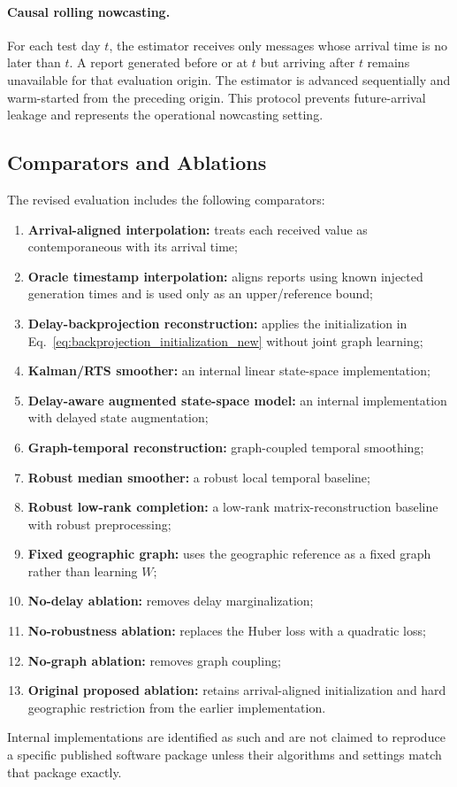 \paragraph{Causal rolling nowcasting.}
For each test day $t$, the estimator receives only messages whose arrival time is no later than $t$. A report generated before or at $t$ but arriving after $t$ remains unavailable for that evaluation origin. The estimator is advanced sequentially and warm-started from the preceding origin. This protocol prevents future-arrival leakage and represents the operational nowcasting setting.

\subsection{Comparators and Ablations}
\label{subsec:comparators_new}
The revised evaluation includes the following comparators:
\begin{enumerate}
    \item \textbf{Arrival-aligned interpolation:} treats each received value as contemporaneous with its arrival time;
    \item \textbf{Oracle timestamp interpolation:} aligns reports using known injected generation times and is used only as an upper/reference bound;
    \item \textbf{Delay-backprojection reconstruction:} applies the initialization in Eq.~\eqref{eq:backprojection_initialization_new} without joint graph learning;
    \item \textbf{Kalman/RTS smoother:} an internal linear state-space implementation;
    \item \textbf{Delay-aware augmented state-space model:} an internal implementation with delayed state augmentation;
    \item \textbf{Graph-temporal reconstruction:} graph-coupled temporal smoothing;
    \item \textbf{Robust median smoother:} a robust local temporal baseline;
    \item \textbf{Robust low-rank completion:} a low-rank matrix-reconstruction baseline with robust preprocessing;
    \item \textbf{Fixed geographic graph:} uses the geographic reference as a fixed graph rather than learning $W$;
    \item \textbf{No-delay ablation:} removes delay marginalization;
    \item \textbf{No-robustness ablation:} replaces the Huber loss with a quadratic loss;
    \item \textbf{No-graph ablation:} removes graph coupling;
    \item \textbf{Original proposed ablation:} retains arrival-aligned initialization and hard geographic restriction from the earlier implementation.
\end{enumerate}
Internal implementations are identified as such and are not claimed to reproduce a specific published software package unless their algorithms and settings match that package exactly.

